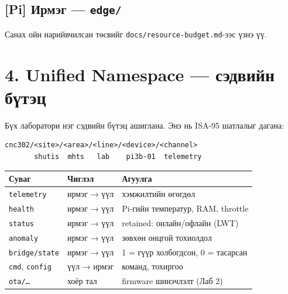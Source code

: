 \hypertarget{pi-ux438ux440ux43cux44dux433-edge}{%
\subsection{\texorpdfstring{{[}Pi{]} Ирмэг --- \texttt{edge/}}{{[}Pi{]} Ирмэг --- edge/}}\label{pi-ux438ux440ux43cux44dux433-edge}}

\begin{Shaded}
\begin{Highlighting}[]
\end{Highlighting}
\end{Shaded}

Санах ойн нарийвчилсан төсвийг \texttt{docs/\allowbreak{}resource-budget.\allowbreak{}md}-ээс үзнэ үү.

\hypertarget{unified-namespace-ux441ux44dux434ux432ux438ux439ux43d-ux431ux4afux442ux44dux446}{%
\section{4. Unified Namespace --- сэдвийн бүтэц}\label{unified-namespace-ux441ux44dux434ux432ux438ux439ux43d-ux431ux4afux442ux44dux446}}

Бүх лаборатори нэг сэдвийн бүтэц ашиглана. Энэ нь ISA-95 шатлалыг дагана:

\begin{verbatim}
cnc302/<site>/<area>/<line>/<device>/<channel>
       shutis  mhts   lab    pi3b-01  telemetry
\end{verbatim}

\begingroup\scriptsize\begin{longtable}[]{@{}lll@{}}
\toprule
Суваг & Чиглэл & Агуулга\tabularnewline
\midrule
\endhead
\texttt{telemetry} & ирмэг → үүл & хэмжилтийн өгөгдөл\tabularnewline
\texttt{health} & ирмэг → үүл & Pi-гийн температур, RAM, throttle\tabularnewline
\texttt{status} & ирмэг → үүл & retained: онлайн/офлайн (LWT)\tabularnewline
\texttt{anomaly} & ирмэг → үүл & зөвхөн онцгой тохиолдол\tabularnewline
\texttt{bridge/state} & ирмэг → үүл & 1 = гүүр холбогдсон, 0 = тасарсан\tabularnewline
\texttt{cmd}, \texttt{config} & үүл → ирмэг & команд, тохиргоо\tabularnewline
\texttt{ota/\ldots{}} & хоёр тал & firmware шинэчлэлт (Лаб 2)\tabularnewline
\bottomrule
\end{longtable}\endgroup

